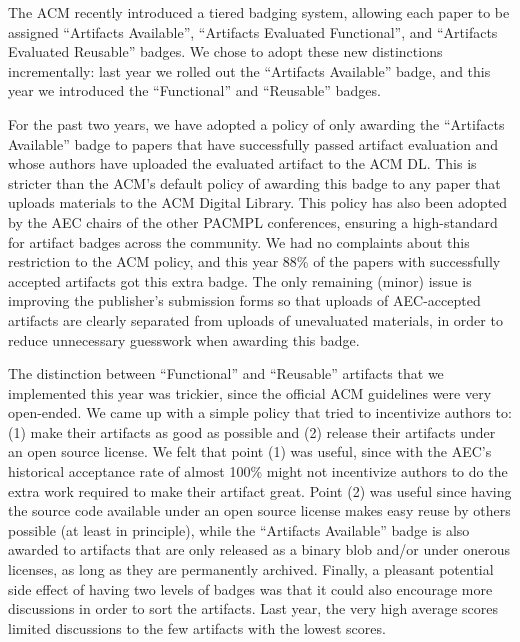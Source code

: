The ACM recently introduced a tiered badging system, allowing each
paper to be assigned “Artifacts Available”, “Artifacts Evaluated
Functional”, and “Artifacts Evaluated Reusable” badges. We chose to
adopt these new distinctions incrementally: last year we rolled out
the “Artifacts Available” badge, and this year we introduced the
“Functional” and “Reusable” badges.

For the past two years, we have adopted a policy of only awarding the
“Artifacts Available” badge to papers that have successfully passed
artifact evaluation and whose authors have uploaded the evaluated
artifact to the ACM DL. This is stricter than the ACM's default policy
of awarding this badge to any paper that uploads materials to the ACM
Digital Library. This policy has also been adopted by the AEC chairs
of the other PACMPL conferences, ensuring a high-standard for artifact
badges across the community. We had no complaints about this
restriction to the ACM policy, and this year 88\% of the papers with
successfully accepted artifacts got this extra badge. The only
remaining (minor) issue is improving the publisher's submission forms
so that uploads of AEC-accepted artifacts are clearly separated from
uploads of unevaluated materials, in order to reduce unnecessary
guesswork when awarding this badge.

The distinction between “Functional” and “Reusable” artifacts that we
implemented this year was trickier, since the official ACM guidelines
were very open-ended. We came up with a simple policy that tried to
incentivize authors to: (1) make their artifacts as good as possible
and (2) release their artifacts under an open source license. We felt
that point (1) was useful, since with the AEC's historical acceptance
rate of almost 100\% might not incentivize authors to do the extra
work required to make their artifact great. Point (2) was useful since
having the source code available under an open source license makes
easy reuse by others possible (at least in principle), while the
“Artifacts Available” badge is also awarded to artifacts that are only
released as a binary blob and/or under onerous licenses, as long as
they are permanently archived. Finally, a pleasant potential side
effect of having two levels of badges was that it could also encourage
more discussions in order to sort the artifacts. Last year, the very
high average scores limited discussions to the few artifacts with the
lowest scores.

